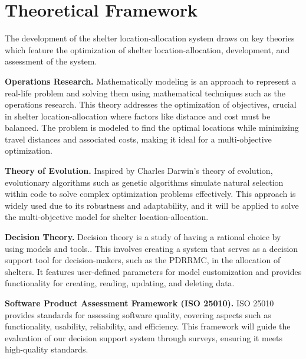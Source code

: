 \section{Theoretical Framework}

The development of the shelter location-allocation system draws on key theories which feature the optimization of shelter location-allocation, development, and assessment of the system.

	\textbf{Operations Research.} Mathematically modeling is an approach to represent a real-life problem and solving them using mathematical techniques such as the operations research. This theory addresses the optimization of objectives, crucial in shelter location-allocation where factors like distance and cost must be balanced. The problem is modeled to find the optimal locations while minimizing travel distances and associated costs, making it ideal for a multi-objective optimization.
	
	\textbf{Theory of Evolution.} Inspired by Charles Darwin’s theory of evolution, evolutionary algorithms such as genetic algorithms simulate natural selection within code to solve complex optimization problems effectively. This approach is widely used due to its robustness and adaptability, and it will be applied to solve the multi-objective model for shelter location-allocation.
	
	\textbf{Decision Theory.} Decision theory is a study of having a rational choice by using models and tools.. This involves creating a system that serves as a decision support tool for decision-makers, such as the PDRRMC, in the allocation of shelters. It features user-defined parameters for model customization and provides functionality for creating, reading, updating, and deleting data.
	
	\textbf{Software Product Assessment Framework (ISO 25010).} ISO 25010 provides standards for assessing software quality, covering aspects such as functionality, usability, reliability, and efficiency. This framework will guide the evaluation of our decision support system through surveys, ensuring it meets high-quality standards.
	 
